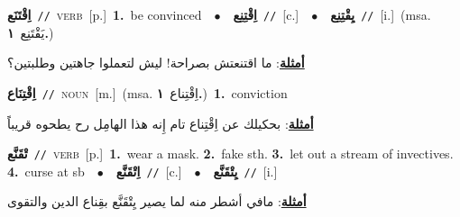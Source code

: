 \documentclass[10pt,a4paper,twoside]{article} %
\begin{document}
\begin{multicols}{2}
{\setlength\topsep{0pt}\textbf{\foreignlanguage{arabic}{اِقْتَنَع}}\ {\color{gray}\texttt{//}\color{black}}\ \textsc{verb}\ [p.]\ \textbf{1.}~be convinced\ \ $\bullet$\ \ \setlength\topsep{0pt}\textbf{\foreignlanguage{arabic}{اِقْتِنِع}}\ {\color{gray}\texttt{//}\color{black}}\ [c.]\ \ $\bullet$\ \ \setlength\topsep{0pt}\textbf{\foreignlanguage{arabic}{يِقْتِنِع}}\ {\color{gray}\texttt{//}\color{black}}\ [i.]\ \color{gray}(msa. \foreignlanguage{arabic}{يَقْتَنِع}~\foreignlanguage{arabic}{\textbf{١.}})\color{black}\  \begin{flushright}\color{gray}\foreignlanguage{arabic}{\textbf{\underline{\foreignlanguage{arabic}{أمثلة}}}: ما اقتنعتش بصراحة! ليش لتعملوا جاهتين وطلبتين؟}\end{flushright}\color{black}} \vspace{2mm}

{\setlength\topsep{0pt}\textbf{\foreignlanguage{arabic}{اِقْتِنَاع}}\ {\color{gray}\texttt{//}\color{black}}\ \textsc{noun}\ [m.]\ \color{gray}(msa. \foreignlanguage{arabic}{اِقْتِناع}~\foreignlanguage{arabic}{\textbf{١.}})\color{black}\ \textbf{1.}~conviction\  \begin{flushright}\color{gray}\foreignlanguage{arabic}{\textbf{\underline{\foreignlanguage{arabic}{أمثلة}}}: بحكيلك عن اِقْتِناع تام إِنه هذا الهامِل رح يطحوه قريباً}\end{flushright}\color{black}} \vspace{2mm}

{\setlength\topsep{0pt}\textbf{\foreignlanguage{arabic}{تْقَنَّع}}\ {\color{gray}\texttt{//}\color{black}}\ \textsc{verb}\ [p.]\ \textbf{1.}~wear a mask.  \textbf{2.}~fake sth.  \textbf{3.}~let out a stream of invectives.  \textbf{4.}~curse at sb\ \ $\bullet$\ \ \setlength\topsep{0pt}\textbf{\foreignlanguage{arabic}{اِتْقَنَّع}}\ {\color{gray}\texttt{//}\color{black}}\ [c.]\ \ $\bullet$\ \ \setlength\topsep{0pt}\textbf{\foreignlanguage{arabic}{يِتْقَنَّع}}\ {\color{gray}\texttt{//}\color{black}}\ [i.]\  \begin{flushright}\color{gray}\foreignlanguage{arabic}{\textbf{\underline{\foreignlanguage{arabic}{أمثلة}}}: مافي أشطر منه لما يصير يِتْقَنَّع بقِناع الدين والتقوى}\end{flushright}\color{black}} \vspace{2mm}


\end{multicols}
\end{document}
